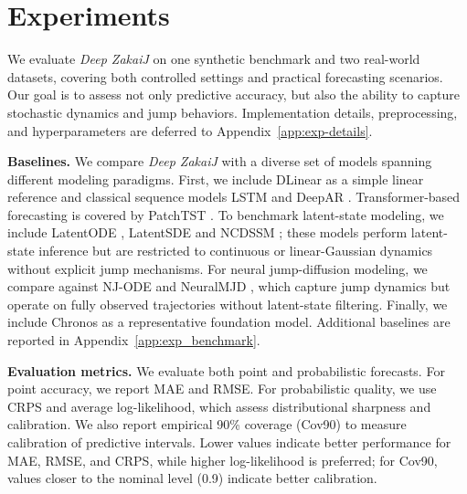 \documentclass{article}
\newcommand{\lengComments}[1]{\par\smallskip\noindent\textcolor{lengCommentColor}{\textbf{[Leng comment:} #1\textbf{]}}\par\smallskip}
\begin{document}
\section{Experiments}
\label{sec:experiments}

We evaluate \textit{Deep ZakaiJ} on one synthetic benchmark and two real-world datasets, covering both controlled settings and practical forecasting scenarios. Our goal is to assess not only predictive accuracy, but also the ability to capture stochastic dynamics and jump behaviors. Implementation details, preprocessing, and hyperparameters are deferred to Appendix~\ref{app:exp-details}.


\textbf{Baselines.}
We compare \textit{Deep ZakaiJ} with a diverse set of models spanning different modeling paradigms. First, we include DLinear \citep{Zeng2022AreTE} as a simple linear reference and classical sequence models LSTM \citep{yu2019review} and DeepAR \citep{salinas2020deepar}. Transformer-based forecasting is covered by PatchTST \citep{nie2023a}. To benchmark latent-state modeling, we include LatentODE \citep{rubanova2019latent}, LatentSDE \citep{li2020scalable} and NCDSSM \citep{ansari2023neural}; these models perform latent-state inference but are restricted to continuous or linear-Gaussian dynamics without explicit jump mechanisms. For neural jump-diffusion modeling, we compare against NJ-ODE \citep{herrera2021neural} and NeuralMJD \citep{gao2025neural}, which capture jump dynamics but operate on fully observed trajectories without latent-state filtering. Finally, we include Chronos \citep{ansari2024chronos} as a representative foundation model. Additional baselines are reported in Appendix~\ref{app:exp_benchmark}.

\textbf{Evaluation metrics.}
We evaluate both point and probabilistic forecasts. 
For point accuracy, we report MAE and RMSE. 
For probabilistic quality, we use CRPS \citep{gneiting2007strictly} and average log-likelihood, which assess distributional sharpness and calibration. 
We also report empirical 90\% coverage (Cov90) to measure calibration of predictive intervals. 
Lower values indicate better performance for MAE, RMSE, and CRPS, while higher log-likelihood is preferred; for Cov90, values closer to the nominal level (0.9) indicate better calibration.
\end{document}

